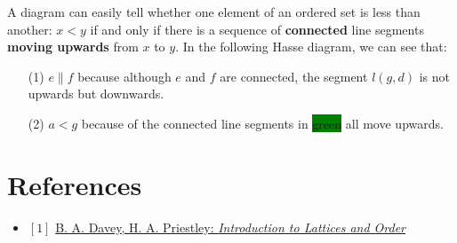 \documentclass[12pt, letterpaper, oneside]{book}
\begin{document}
A diagram can easily tell whether one element of an ordered set is less than another: $x < y$ if and only if there is a
sequence of \textbf{connected} line segments \textbf{moving upwards} from $x$ to $y$. In the following Hasse diagram, we
can see that:
\begin{enumerate}
  \item[(1)] $e \parallel f$ because although $e$ and $f$ are connected, the segment $l(g, d)$ is not upwards but
        downwards.
  \item[(2)] $a < g$ because of the connected line segments in \colorbox{green}{green} all move upwards.
\end{enumerate}


%
%

\chapter*{References}

\begin{itemize}
  \item $[1]$ \href{https://www.cambridge.org/core/books/introduction-to-lattices-and-order/946458CB6638AF86D85BA00F5787F4F4}{B. A. Davey, H. A. Priestley: \it{Introduction to Lattices and Order}}
\end{itemize}
\end{document}
